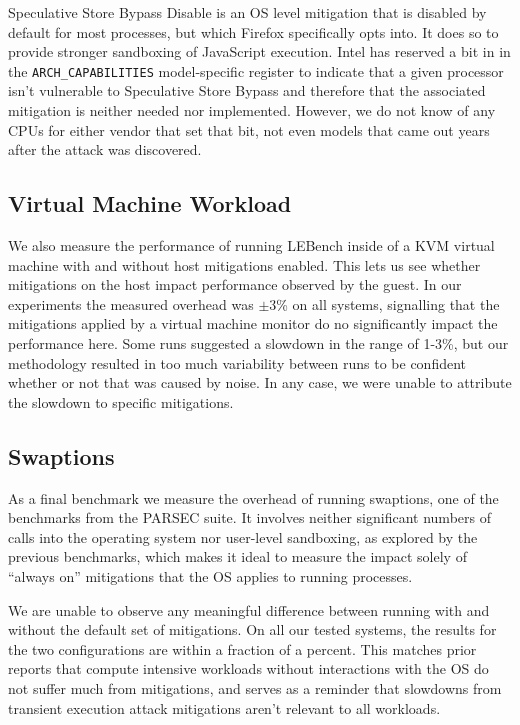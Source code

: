 Speculative Store Bypass Disable is an OS level mitigation that is disabled by default for most processes, but which Firefox specifically opts into.
It does so to provide stronger sandboxing of JavaScript execution.
Intel has reserved a bit in in the \texttt{ARCH\_CAPABILITIES} model-specific register to indicate that a given processor isn't vulnerable to Speculative Store Bypass and therefore that the associated mitigation is neither needed nor implemented.
However, we do not know of any CPUs for either vendor that set that bit, not even models that came out years after the attack was discovered.

\subsection{Virtual Machine Workload}
\label{sec:benchmarks:vm}

We also measure the performance of running LEBench inside of a KVM virtual machine with and without host mitigations enabled.
This lets us see whether mitigations on the host impact performance observed by the guest.
In our experiments the measured overhead was $\pm 3$\% on all systems, signalling that the mitigations applied by a virtual machine monitor do no significantly impact the performance here.
Some runs suggested a slowdown in the range of 1-3\%, but our methodology resulted in too much variability between runs to be confident whether or not that was caused by noise. 
In any case, we were unable to attribute the slowdown to specific mitigations.

\subsection{Swaptions}
\label{sec:benchmarks:parsec}
\label{sec:parsec}
As a final benchmark we measure the overhead of running swaptions, one of the benchmarks from the PARSEC suite.
It involves neither significant numbers of calls into the operating system nor user-level sandboxing, as explored by the previous benchmarks, which makes it ideal to measure the impact solely of ``always on'' mitigations that the OS applies to running processes.

We are unable to observe any meaningful difference between running with and without the default set of mitigations.
On all our tested systems, the results for the two configurations are within a fraction of a percent.
This matches prior reports that compute intensive workloads without interactions with the OS do not suffer much from mitigations, and serves as a reminder that slowdowns from transient execution attack mitigations aren't relevant to all workloads.

